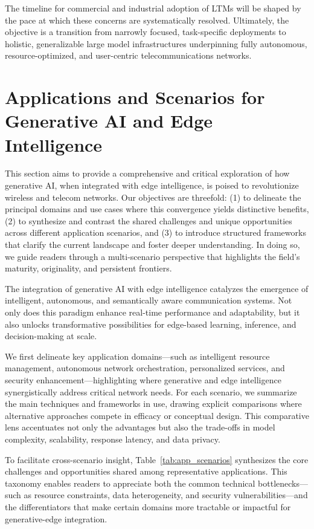 \documentclass[sigconf]{acmart}
\begin{document}
The timeline for commercial and industrial adoption of LTMs will be shaped by the pace at which these concerns are systematically resolved. Ultimately, the objective is a transition from narrowly focused, task-specific deployments to holistic, generalizable large model infrastructures underpinning fully autonomous, resource-optimized, and user-centric telecommunications networks.

\section{Applications and Scenarios for Generative AI and Edge Intelligence}

This section aims to provide a comprehensive and critical exploration of how generative AI, when integrated with edge intelligence, is poised to revolutionize wireless and telecom networks. Our objectives are threefold: (1) to delineate the principal domains and use cases where this convergence yields distinctive benefits, (2) to synthesize and contrast the shared challenges and unique opportunities across different application scenarios, and (3) to introduce structured frameworks that clarify the current landscape and foster deeper understanding. In doing so, we guide readers through a multi-scenario perspective that highlights the field's maturity, originality, and persistent frontiers.

The integration of generative AI with edge intelligence catalyzes the emergence of intelligent, autonomous, and semantically aware communication systems. Not only does this paradigm enhance real-time performance and adaptability, but it also unlocks transformative possibilities for edge-based learning, inference, and decision-making at scale.

We first delineate key application domains—such as intelligent resource management, autonomous network orchestration, personalized services, and security enhancement—highlighting where generative and edge intelligence synergistically address critical network needs. For each scenario, we summarize the main techniques and frameworks in use, drawing explicit comparisons where alternative approaches compete in efficacy or conceptual design. This comparative lens accentuates not only the advantages but also the trade-offs in model complexity, scalability, response latency, and data privacy.

To facilitate cross-scenario insight, Table~\ref{tab:app_scenarios} synthesizes the core challenges and opportunities shared among representative applications. This taxonomy enables readers to appreciate both the common technical bottlenecks—such as resource constraints, data heterogeneity, and security vulnerabilities—and the differentiators that make certain domains more tractable or impactful for generative-edge integration.
\end{document}
